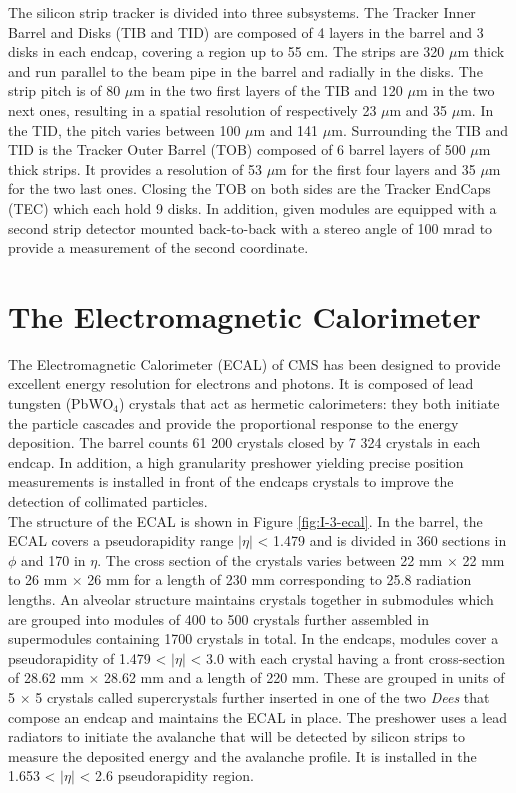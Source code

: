     The silicon strip tracker is divided into three subsystems. The Tracker Inner Barrel and Disks (TIB and TID) are composed of 4 layers in the barrel and 3 disks in each endcap, covering a region up to 55 cm. The strips are 320 $\mu$m thick and run parallel to the beam pipe in the barrel and radially in the disks. The strip pitch is of 80 $\mu$m in the two first layers of the TIB and 120 $\mu$m in the two next ones, resulting in a spatial resolution of respectively 23 $\mu$m and 35 $\mu$m. In the TID, the pitch varies between 100 $\mu$m and 141 $\mu$m. Surrounding the TIB and TID is the Tracker Outer Barrel (TOB) composed of 6 barrel layers of 500 $\mu$m thick strips. It provides a resolution of 53 $\mu$m for the first four layers and 35 $\mu$m for the two last ones. Closing the TOB on both sides are the Tracker EndCaps (TEC) which each hold 9 disks. In addition, given modules are equipped with a second strip detector mounted back-to-back with a stereo angle of 100 mrad to provide a measurement of the second coordinate.

  \section{The Electromagnetic Calorimeter}

    The Electromagnetic Calorimeter (ECAL) of CMS has been designed to provide excellent energy resolution for electrons and photons. It is composed of lead tungsten (PbWO$_4$) crystals that act as hermetic calorimeters: they both initiate the particle cascades and provide the proportional response to the energy deposition. The barrel counts 61 200 crystals closed by 7 324 crystals in each endcap. In addition, a high granularity preshower yielding precise position measurements is installed in front of the endcaps crystals to improve the detection of collimated particles. \\

    The structure of the ECAL is shown in Figure \ref{fig:I-3-ecal}. In the barrel, the ECAL covers a pseudorapidity range $ | \eta | $ < 1.479 and is divided in 360 sections in $ \phi $ and 170 in $ \eta $. The cross section of the crystals varies between 22 mm $ \times $ 22 mm to 26 mm $ \times $ 26 mm for a length of 230 mm corresponding to 25.8 radiation lengths. An alveolar structure maintains crystals together in submodules which are grouped into modules of 400 to 500 crystals further assembled in supermodules containing 1700 crystals in total. In the endcaps, modules cover a pseudorapidity of 1.479 < $ | \eta | $ < 3.0 with each crystal having a front cross-section of 28.62 mm $ \times $ 28.62 mm and a length of 220 mm. These are grouped in units of 5 $ \times $ 5 crystals called supercrystals further inserted in one of the two \emph{Dees} that compose an endcap and maintains the ECAL in place. The preshower uses a lead radiators to initiate the avalanche that will be detected by silicon strips to measure the deposited energy and the avalanche profile. It is installed in the 1.653 < $ | \eta | $ < 2.6 pseudorapidity region. \\

